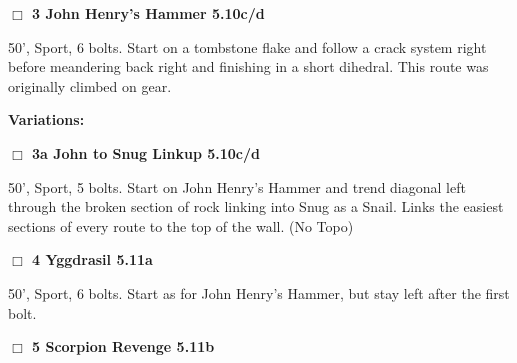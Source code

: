 	\begin{multicols}{2}

\needspace{2em}
\label{rt:John Henry's Hammer}
\colorbox{RoyalBlue!20}{
\parbox{0.95\linewidth}{
\hspace{-1ex}\textbf{$\Box$
3 John Henry's Hammer 5.10c/d  
}}}
\begin{adjustwidth}{1.3em}{}			

50', Sport, 6 bolts. Start on a tombstone flake and follow a crack system right before meandering back right and finishing in a short dihedral. This route was originally climbed on gear.
\end{adjustwidth}


\begin{adjustwidth}{0.5cm}{}				
\needspace{4em}
\textbf{Variations:} \newline

\needspace{2em}
\label{vr:John to Snug Linkup}
\colorbox{RoyalBlue!20}{
\parbox{0.95\linewidth}{
\hspace{-1ex}\textbf{$\Box$
3a John to Snug Linkup 5.10c/d  
}}}
\begin{adjustwidth}{1.3em}{}			

50', Sport, 5 bolts. Start on John Henry's Hammer and trend diagonal left through the broken section of rock linking into Snug as a Snail. Links the easiest sections of every route to the top of the wall.
  (No Topo)
\end{adjustwidth}



\end{adjustwidth}


\needspace{2em}
\label{rt:Yggdrasil}
\colorbox{RoyalBlue!20}{
\parbox{0.95\linewidth}{
\hspace{-1ex}\textbf{$\Box$
4 Yggdrasil 5.11a  
}}}
\begin{adjustwidth}{1.3em}{}			

50', Sport, 6 bolts. Start as for John Henry's Hammer, but stay left after the first bolt.
\end{adjustwidth}




\needspace{2em}
\label{rt:Scorpion Revenge}
\colorbox{RoyalBlue!20}{
\parbox{0.95\linewidth}{
\hspace{-1ex}\textbf{$\Box$
5 Scorpion Revenge 5.11b  
}}}
\begin{adjustwidth}{1.3em}{}			


\end{adjustwidth}
\end{multicols}
